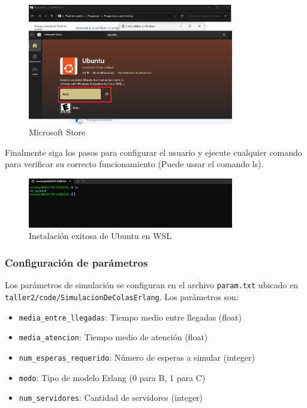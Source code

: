\documentclass{article}
\begin{document}
\begin{enumerate}
    \begin{figure}[H]
    \centering
    \includegraphics[width=0.8\textwidth]{images/manualUsuarioErlangBC_8.png}
    \caption{Microsoft Store}
    \label{fig:version}
\end{figure}

Finalmente siga los pasos para configurar el usuario y ejecute cualquier comando para verificar su correcto funcionamiento (Puede ussar el comando ls).

\begin{figure}[H]
    \centering
    \includegraphics[width=0.8\textwidth]{images/manualUsuarioErlangBC_9.png}
    \caption{Instalación exitosa de Ubuntu en WSL}
    \label{fig:version}
\end{figure}

\end{enumerate}

\subsubsection{Configuración de parámetros}
Los parámetros de simulación se configuran en el archivo \texttt{param.txt} ubicado en \texttt{taller2/code/SimulacionDeColasErlang}. Los parámetros son:

\begin{itemize}
    \item \texttt{media\_entre\_llegadas}: Tiempo medio entre llegadas (float)
    \item \texttt{media\_atencion}: Tiempo medio de atención (float)
    \item \texttt{num\_esperas\_requerido}: Número de esperas a simular (integer)
    \item \texttt{modo}: Tipo de modelo Erlang (0 para B, 1 para C)
    \item \texttt{num\_servidores}: Cantidad de servidores (integer)
\end{itemize}
\end{document}
